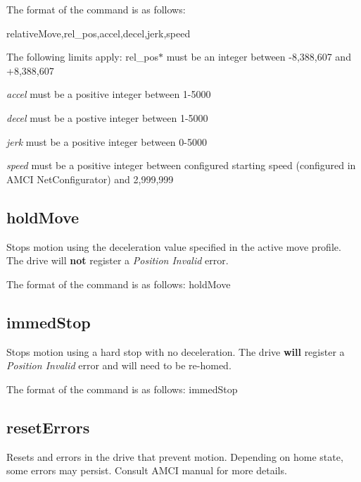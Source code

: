 The format of the command is as follows\+:

{\ttfamily relative\+Move,rel\+\_\+pos,accel,decel,jerk,speed}

The following limits apply\+: rel\+\_\+pos$\ast$ must be an integer between -\/8,388,607 and +8,388,607

{\itshape accel} must be a positive integer between 1-\/5000

{\itshape decel} must be a postive integer between 1-\/5000

{\itshape jerk} must be a positive integer between 0-\/5000

{\itshape speed} must be a positive integer between configured starting speed (configured in A\+M\+C\+I Net\+Configurator) and 2,999,999\hypertarget{index_holdMove}{}\subsection{hold\+Move}\label{index_holdMove}
Stops motion using the deceleration value specified in the active move profile. The drive will {\bfseries not} register a {\itshape Position Invalid} error.

The format of the command is as follows\+: {\ttfamily hold\+Move}\hypertarget{index_immedStop}{}\subsection{immed\+Stop}\label{index_immedStop}
Stops motion using a hard stop with no deceleration. The drive {\bfseries will} register a {\itshape Position Invalid} error and will need to be re-\/homed.

The format of the command is as follows\+: {\ttfamily immed\+Stop}\hypertarget{index_resetErrors}{}\subsection{reset\+Errors}\label{index_resetErrors}
Resets and errors in the drive that prevent motion. Depending on home state, some errors may persist. Consult A\+M\+C\+I manual for more details.

